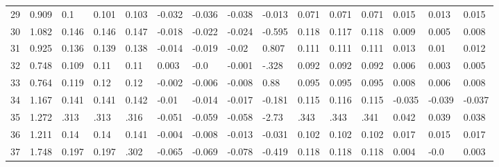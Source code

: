 \begin{table}
\begin{tabular}{|l|l|lll|lll|l|lll|lll}
		29 & 0.909 & 0.1 & 0.101 & 0.103 & -0.032 & -0.036 & -0.038 & -0.013 & 0.071 & 0.071 & 0.071 & 0.015 & 0.013 & 0.015 \\
		30 & 1.082 & 0.146 & 0.146 & 0.147 & -0.018 & -0.022 & -0.024 & -0.595 & 0.118 & 0.117 & 0.118 & 0.009 & 0.005 & 0.008 \\
		31 & 0.925 & 0.136 & 0.139 & 0.138 & -0.014 & -0.019 & -0.02 & 0.807 & 0.111 & 0.111 & 0.111 & 0.013 & 0.01 & 0.012 \\
		32 & 0.748 & 0.109 & 0.11 & 0.11 & 0.003 & -0.0 & -0.001 & -.328 & 0.092 & 0.092 & 0.092 & 0.006 & 0.003 & 0.005 \\
		33 & 0.764 & 0.119 & 0.12 & 0.12 & -0.002 & -0.006 & -0.008 & 0.88 & 0.095 & 0.095 & 0.095 & 0.008 & 0.006 & 0.008 \\
		34 & 1.167 & 0.141 & 0.141 & 0.142 & -0.01 & -0.014 & -0.017 & -0.181 & 0.115 & 0.116 & 0.115 & -0.035 & -0.039 & -0.037 \\
		35 & 1.272 & .313 & .313 & .316 & -0.051 & -0.059 & -0.058 & -2.73 & .343 & .343 & .341 & 0.042 & 0.039 & 0.038 \\
		36 & 1.211 & 0.14 & 0.14 & 0.141 & -0.004 & -0.008 & -0.013 & -0.031 & 0.102 & 0.102 & 0.102 & 0.017 & 0.015 & 0.017 \\
		37 & 1.748 & 0.197 & 0.197 & .302 & -0.065 & -0.069 & -0.078 & -0.419 & 0.118 & 0.118 & 0.118 & 0.004 & -0.0 & 0.003 
	\end{tabular}

\end{table}
